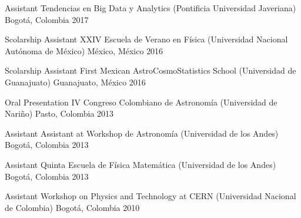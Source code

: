


\begin{cvhonors}


    \cvhonor
    {Assistant}
    {Tendencias en Big Data y Analytics (Pontificia Universidad Javeriana)}
    {Bogotá, Colombia}
    {2017}

    \cvhonor
    {Scolarship Assistant} %
    {XXIV Escuela de Verano en Física (Universidad Nacional Autónoma de México)} %
    {México, México} %
    {2016} %

    \cvhonor
    {Scolarship Assistant} %
    {First Mexican AstroCosmoStatistics School (Universidad de Guanajuato)} %
    {Guanajuato, México} %
    {2016} %

    \cvhonor
    {Oral Presentation} %
    {IV Congreso Colombiano de Astronomía (Universidad de Nariño)} %
    {Pasto, Colombia} %
    {2013} %

    \cvhonor
    {Assistant} %
    {Assistant at Workshop de Astronomía (Universidad de los Andes)} %
    {Bogotá, Colombia} %
    {2013} %

    \cvhonor
    {Assistant} %
    {Quinta Escuela de Física Matemática (Universidad de los Andes)} %
    {Bogotá, Colombia} %
    {2013} %

    \cvhonor
    {Assistant} %
    {Workshop on Physics and Technology at CERN (Universidad Nacional de Colombia)} %
    {Bogotá, Colombia} %
    {2010} %

\end{cvhonors}
